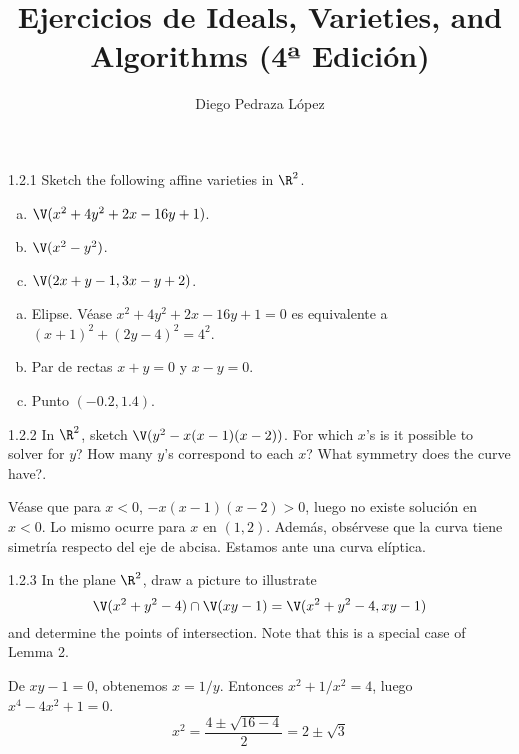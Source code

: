 \documentclass[twoside]{article}
\begin{document}
\title{Ejercicios de Ideals, Varieties, and Algorithms (4ª Edición)}
\author{Diego Pedraza López}
\maketitle

\begin{ejercicio}{1.2.1}
Sketch the following affine varieties in $\R^2$.
\begin{enumerate}[a.]
\item $\V(x^2+4y^2+2x-16y+1)$.
\item $\V(x^2-y^2)$.
\item $\V(2x+y-1,3x-y+2)$.
\end{enumerate}
\end{ejercicio}
\begin{solucion}
\begin{enumerate}[a.]
\item Elipse. Véase $x^2+4y^2+2x-16y+1=0$ es equivalente a $(x+1)^2+(2y-4)^2=4^2$.
\item Par de rectas $x+y=0$ y $x-y=0$.
\item Punto $(-0.2,1.4)$.
\end{enumerate}
\end{solucion}

\begin{ejercicio}{1.2.2}
In $\R^2$, sketch $\V(y^2-x(x-1)(x-2))$.
For which $x$'s is it possible to solver for $y$?
How many $y$'s correspond to each $x$?
What symmetry does the curve have?.
\end{ejercicio}
\begin{solucion}
Véase que para $x<0$, $-x(x-1)(x-2)>0$, luego no existe solución en $x<0$.
Lo mismo ocurre para $x$ en $(1,2)$.
Además, obsérvese que la curva tiene simetría respecto del eje de abcisa.
Estamos ante una curva elíptica.
\end{solucion}

\begin{ejercicio}{1.2.3}
In the plane $\R^2$, draw a picture to illustrate
\[ \V(x^2+y^2-4) \cap \V(xy-1) = \V(x^2+y^2-4,xy-1) \]
and determine the points of intersection. Note that this is a special case of Lemma 2.
\end{ejercicio}
\begin{solucion}
De $xy-1=0$, obtenemos $x=1/y$. Entonces $x^2+1/x^2=4$, luego $x^4-4x^2+1=0$.
\[ x^2 = \frac{4 \pm \sqrt{16-4}}{2} = 2 \pm \sqrt{3} \]
\end{solucion}
\end{document}
